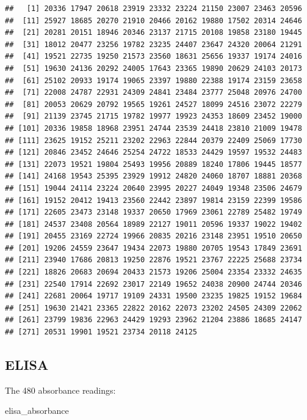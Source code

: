\documentclass[
]{article}
\newenvironment{Shaded}{\begin{snugshade}}{\end{snugshade}}
\newcommand{\NormalTok}[1]{#1}
\begin{document}
\begin{verbatim}
##   [1] 20336 17947 20618 23919 23332 23224 21150 23007 23463 20596
##  [11] 25927 18685 20270 21910 20466 20162 19880 17502 20314 24646
##  [21] 20281 20151 18946 20346 23137 21715 20108 19858 23180 19445
##  [31] 18012 20477 23256 19782 23235 24407 23647 24320 20064 21291
##  [41] 19521 22735 19250 21573 23560 18631 25656 19337 19174 24016
##  [51] 19630 24136 20292 24005 17643 23365 19890 20629 24103 20173
##  [61] 25102 20933 19174 19065 23397 19880 22388 19174 23159 23658
##  [71] 22008 24787 22931 24309 24841 23484 23777 25048 20976 24700
##  [81] 20053 20629 20792 19565 19261 24527 18099 24516 23072 22279
##  [91] 21139 23745 21715 19782 19977 19923 24353 18609 23452 19000
## [101] 20336 19858 18968 23951 24744 23539 24418 23810 21009 19478
## [111] 23625 19152 25211 23202 22963 22844 20379 22409 25069 17730
## [121] 20846 23452 24646 25254 24722 18533 24429 19597 19532 24483
## [131] 22073 19521 19804 25493 19956 20889 18240 17806 19445 18577
## [141] 24168 19543 25395 23929 19912 24820 24060 18707 18881 20368
## [151] 19044 24114 23224 20640 23995 20227 24049 19348 23506 24679
## [161] 19152 20412 19413 23560 22442 23897 19814 23159 22399 19586
## [171] 22605 23473 23148 19337 20650 17969 23061 22789 25482 19749
## [181] 24537 23408 20564 18989 22127 19011 20596 19337 19022 19402
## [191] 20455 23169 22724 19966 20835 20216 23148 23951 19510 20650
## [201] 19206 24559 23647 19434 22073 19880 20705 19543 17849 23691
## [211] 23940 17686 20813 19250 22876 19521 23767 22225 25688 23734
## [221] 18826 20683 20694 20433 21573 19206 25004 23354 23332 24635
## [231] 22540 17914 22692 23017 22149 19652 24038 20900 24744 20346
## [241] 22681 20064 19717 19109 24331 19500 23235 19825 19152 19684
## [251] 19630 21421 23365 22822 20162 22073 23202 24505 24309 22062
## [261] 23799 19836 22963 24429 19293 23962 21204 23886 18685 24147
## [271] 20531 19901 19521 23734 20118 24125
\end{verbatim}

\hypertarget{elisa-absorbance}{%
\subsection{ELISA}\label{elisa-absorbance}}

The 480 absorbance readings:

\begin{Shaded}
\begin{Highlighting}[]
\NormalTok{elisa_absorbance}
\end{Highlighting}
\end{Shaded}
\end{document}
